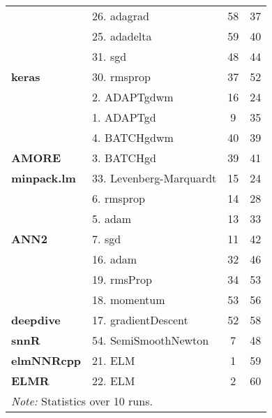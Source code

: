 \begin{table}
\begin{tabular}[t]{>{}llcc}
 & 26. adagrad & 58 & 37\\

 & 25. adadelta & 59 & 40\\

 & 31. sgd & 48 & 44\\

\multirow{-7}{*}{\raggedright\arraybackslash \textbf{keras}} & 30. rmsprop & 37 & 52\\
\cmidrule{1-4}
 & 2. ADAPTgdwm & 16 & 24\\

 & 1. ADAPTgd & 9 & 35\\

 & 4. BATCHgdwm & 40 & 39\\

\multirow{-4}{*}{\raggedright\arraybackslash \textbf{AMORE}} & 3. BATCHgd & 39 & 41\\
\cmidrule{1-4}
\textbf{minpack.lm} & 33. Levenberg-Marquardt & 15 & 24\\
\cmidrule{1-4}
 & 6. rmsprop & 14 & 28\\

 & 5. adam & 13 & 33\\

\multirow{-3}{*}{\raggedright\arraybackslash \textbf{ANN2}} & 7. sgd & 11 & 42\\
\cmidrule{1-4}
 & 16. adam & 32 & 46\\

 & 19. rmsProp & 34 & 53\\

 & 18. momentum & 53 & 56\\

\multirow{-4}{*}{\raggedright\arraybackslash \textbf{deepdive}} & 17. gradientDescent & 52 & 58\\
\cmidrule{1-4}
\textbf{snnR} & 54. SemiSmoothNewton & 7 & 48\\
\cmidrule{1-4}
\textbf{elmNNRcpp} & 21. ELM & 1 & 59\\
\cmidrule{1-4}
\textbf{ELMR} & 22. ELM & 2 & 60\\
\bottomrule
\multicolumn{4}{l}{\rule{0pt}{1em}\textit{Note: } Statistics over 10 runs.}\\
\end{tabular}
\end{table}
